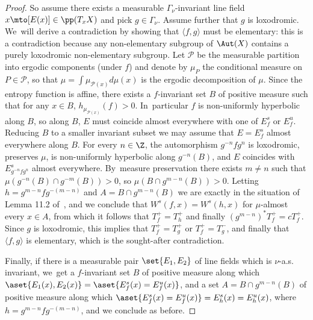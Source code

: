 \begin{proof}
So assume there exists a measurable $\Gamma_\nu$-invariant line field
$x\mto [E(x)]\in \pp(T_xX)$ and pick $g\in \Gamma_\nu$. Assume further that $g$ is loxodromic. We~will derive a contradiction by
showing that $\langle f, g\rangle$ must be elementary: this is a contradiction because
any non-elementary subgroup of $\Aut(X)$ contains a purely loxodromic non-elementary subgroup.
Let $\mathcal P$ be the measurable partition into ergodic components (under $f$) and
denote by $\mu_P$ the conditional
measure on $P\in \mathcal P$, so
that $\mu = \int \mu_{\mathcal P(x)} d\mu(x)$ is the ergodic decomposition of $\mu$.
Since the entropy function is affine, there exists a $f$-invariant
set $B$ of positive measure such that
for any $x\in B$, $h_{\mu_{\mathcal P(x)}}(f)>0$. In~particular $f$ is non-uniformly hyperbolic along $B$, so
along $B$, $E$ must coincide almost everywhere with one of $E^s_f$ or $E^u_f$. Reducing $B$ to a smaller
invariant subset we may
assume that $E = E^s_f$ almost everywhere along $B$.
For every $n\in \Z$, the automorphism $g^{-n} f g^n$ is loxodromic, preserves $\mu$, is
non-uniformly hyperbolic along $g^{-n}(B)$, and $E$ coincides with $E^s_{g^{-n}fg^n}$ almost everywhere. By~measure preservation
there exists $m\neq n$ such that $\mu(g^{-n}(B)\cap g^{-m}(B))>0$, so
$\mu(B\cap g^{m-n}(B))>0$. Letting $h = g^{m-n}fg^{-(m-n)}$ and
$A = B\cap g^{m-n}(B)$ we are exactly in the situation of Lemma 11.2 of~\cite{stiffness}, and
we conclude that $W^s(f, x) = W^s(h, x)$ for $\mu$-almost every $x\in A$, from which it follows that
$T^+_f= T^+_h$ and finally $(g^{m-n})^*T_f^+ = c T^+_f$. Since $g$ is loxodromic, this implies
that $T^+_f = T^+_g$ or $T^+_f = T^-_g$, and finally that $\langle f, g\rangle$ is elementary, which is
the sought-after contradiction.\enlargethispage{.5\baselineskip}%

Finally, if there is a measurable pair $\set{E_1, E_2}$ of line fields which is $\nu$-a.s.
invariant, we~get a $f$-invariant set $B$ of positive measure along which
$\aset{E_1(x), E_2(x) } = \aset{E^s_f(x) =\nobreak E^u_f(x)}$, and a set
$A = B\cap g^{m-n}(B)$ of positive measure along which
$\aset{E^s_f(x) = E^u_f(x)} = {E^s_h(x) = E^u_h(x)}$, where $h = g^{m-n}fg^{-(m-n)}$, and we conclude as before.
\end{proof}
